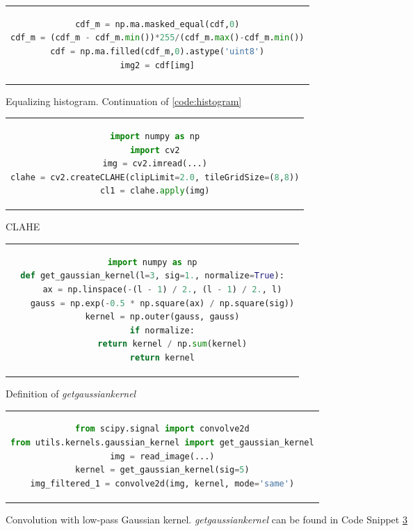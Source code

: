 \begin{figure}[htpb]
	\begin{tabular}{c}
	\begin{lstlisting}[language=Python]
cdf_m = np.ma.masked_equal(cdf,0)
cdf_m = (cdf_m - cdf_m.min())*255/(cdf_m.max()-cdf_m.min())
cdf = np.ma.filled(cdf_m,0).astype('uint8')
img2 = cdf[img]
	\end{lstlisting}
	\end{tabular}
	\caption[Example listing]{Equalizing histogram. Continuation of \ref{code:histogram}}	\label{code:histogram-equalized}
\end{figure}

\begin{figure}[htpb]
	\begin{tabular}{c}
	\begin{lstlisting}[language=Python]
import numpy as np
import cv2
img = cv2.imread(...)
clahe = cv2.createCLAHE(clipLimit=2.0, tileGridSize=(8,8))
cl1 = clahe.apply(img)
	\end{lstlisting}
	\end{tabular}
	\caption[Example listing]{CLAHE}
\label{code:clahe}
\end{figure}

\begin{figure}[htpb]
	\begin{tabular}{c}
	\begin{lstlisting}[language=Python]
import numpy as np
def get_gaussian_kernel(l=3, sig=1., normalize=True):
    ax = np.linspace(-(l - 1) / 2., (l - 1) / 2., l)
    gauss = np.exp(-0.5 * np.square(ax) / np.square(sig))
    kernel = np.outer(gauss, gauss)
    if normalize:
        return kernel / np.sum(kernel)
    return kernel
	\end{lstlisting}
	\end{tabular}
	\caption[Example listing]{Definition of \emph{get\textunderscore gaussian\textunderscore kernel}}
\label{code:get-gaussian-kernel}
\end{figure}

\begin{figure}[htpb]
	\begin{tabular}{c}
	\begin{lstlisting}[language=Python]
from scipy.signal import convolve2d
from utils.kernels.gaussian_kernel import get_gaussian_kernel
img = read_image(...)
kernel = get_gaussian_kernel(sig=5)
img_filtered_1 = convolve2d(img, kernel, mode='same')
	\end{lstlisting}
	\end{tabular}
	\caption[Example listing]{Convolution with low-pass Gaussian kernel. \emph{get\textunderscore gaussian\textunderscore kernel} can be found in Code Snippet \ref{code:get-gaussian-kernel}}
\label{code:gaussian-low-pass}
\end{figure}

